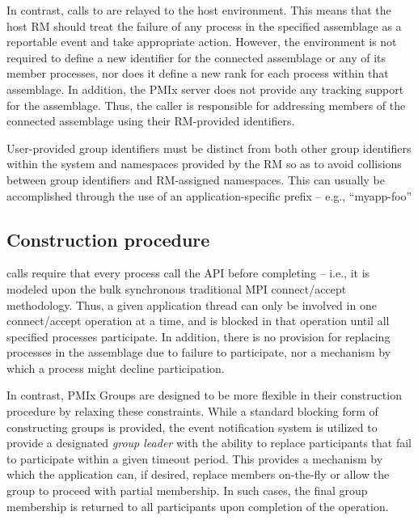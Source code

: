 In contrast, calls to  are relayed to the host environment. This means that the host \ac{RM} should treat the failure of any process in the specified assemblage as a reportable event and take appropriate action. However, the environment is not required to define a new identifier for the connected assemblage or any of its member processes, nor does it define a new rank for each process within that assemblage. In addition, the \ac{PMIx} server does not provide any tracking support for the assemblage. Thus, the caller is responsible for addressing members of the connected assemblage using their \ac{RM}-provided identifiers.

\adviceuserstart
User-provided group identifiers must be distinct from both other group identifiers within the system and namespaces provided by the \ac{RM} so as to avoid collisions between group identifiers and \ac{RM}-assigned namespaces. This can usually be accomplished through the use of an application-specific prefix – e.g., ``myapp-foo''
\adviceuserend


\subsection{Construction procedure}

 calls require that every process call the \ac{API} before completing – i.e., it is modeled upon the bulk synchronous traditional \ac{MPI} connect/accept methodology. Thus, a given application thread can only be involved in one connect/accept operation at a time, and is blocked in that operation until all specified processes participate. In addition, there is no provision for replacing processes in the assemblage due to failure to participate, nor a mechanism by which a process might decline participation.

In contrast, \ac{PMIx} Groups are designed to be more flexible in their construction procedure by relaxing these constraints. While a standard blocking form of constructing groups is provided, the event notification system is utilized to provide a designated \emph{group leader} with the ability to replace participants that fail to participate within a given timeout period. This provides a mechanism by which the application can, if desired, replace members on-the-fly or allow the group to proceed with partial membership. In such cases, the final group membership is returned to all participants upon completion of the operation.

